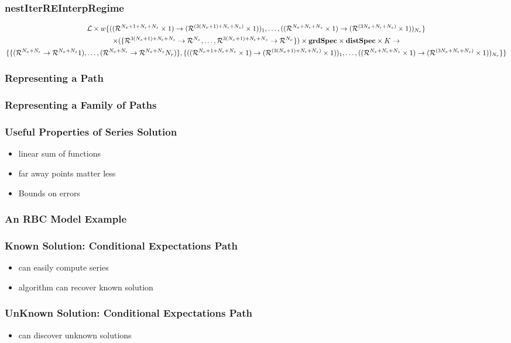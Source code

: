 \documentclass[tikz]{beamer}
\begin{document}
\begin{frame}
\frametitle{nestIterREInterpRegime}
\label{sec:nestiterreinterp}



\begin{gather*}
  \linMod \times 
w\{(\lilXRegimeFuncSig)_1,\ldots,(\lilXFuncSig)_{\numR}\}  \\
 \times (\eqnRegimeFuncSig ) \times \grdSpec \times \dstSpec  \times \numIters \rightarrow\\
\{\frfpnsRegimeFuncSig, \{(\lilXRegimeFuncSig)_1,\ldots,(\lilXFuncSig)_{\numR}\}\}
\end{gather*}


\end{frame}
\begin{frame}
\frametitle{Representing a Path}

\end{frame}
\begin{frame}
\frametitle{Representing a Family of Paths}

\end{frame}
\begin{frame}
\frametitle{Useful Properties of Series Solution}

\begin{itemize}
\item linear sum of functions
\item far away points matter less
\item Bounds on errors
\end{itemize}



\end{frame}
\begin{frame}
\frametitle{An RBC Model Example}
\end{frame}
\begin{frame}
\frametitle{Known Solution: Conditional Expectations Path}
\begin{itemize}
\item can easily compute series
\item algorithm can recover known solution
\end{itemize}


\end{frame}
\begin{frame}
\frametitle{UnKnown Solution: Conditional Expectations Path}
\begin{itemize}
\item can discover unknown solutions
\end{itemize}



\end{frame}
\end{document}
